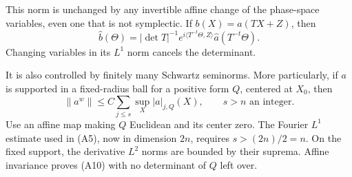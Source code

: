 \documentclass[
  11pt,
]{article}
\begin{document}
This norm is unchanged by any invertible affine change of the
phase-space variables, even one that is not symplectic. If
\(b(X)=a(TX+Z)\), then \[
\widehat b(\Theta)
=|\det T|^{-1}e^{i\langle T^{-t}\Theta,Z\rangle}
\widehat a(T^{-t}\Theta).
\] Changing variables in its \(L^1\) norm cancels the determinant.

It is also controlled by finitely many Schwartz seminorms. More
particularly, if \(a\) is supported in a fixed-radius ball for a
positive form \(Q\), centered at \(X_0\), then \[
\|a^w\|\le C\sum_{j\le s}\sup_X|a|_{j,Q}(X),
\qquad s>n\text{ an integer}.
\tag{A10}
\] Use an affine map making \(Q\) Euclidean and its center zero. The
Fourier \(L^1\) estimate used in (A5), now in dimension \(2n\), requires
\(s>(2n)/2=n\). On the fixed support, the derivative \(L^2\) norms are
bounded by their suprema. Affine invariance proves (A10) with no
determinant of \(Q\) left over.
\end{document}
